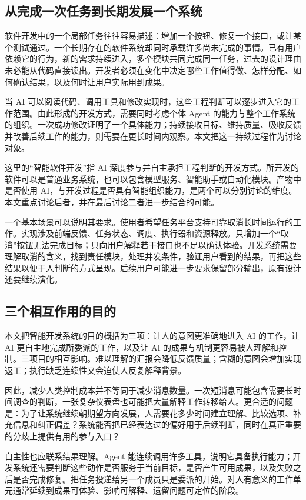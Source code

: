 \label{sec:intro}
\subsection{从完成一次任务到长期发展一个系统}
软件开发中的一个局部任务往往容易描述：增加一个按钮、修复一个接口，或让某个测试通过。一个长期存在的软件系统却同时承载许多尚未完成的事情。已有用户依赖它的行为，新的需求持续进入，多个模块共同完成同一任务，过去的设计理由未必能从代码直接读出。开发者必须在变化中决定哪些工作值得做、怎样分配、如何确认结果，以及何时让用户实际用到成果。

当 AI 可以阅读代码、调用工具和修改实现时，这些工程判断可以逐步进入它的工作范围。由此形成的开发方式，需要同时考虑个体 Agent 的能力与整个工作系统的组织。一次成功修改证明了一个具体能力；持续接收目标、维持质量、吸收反馈并改善后续工作的能力，则需要在更长时间内观察。本文把这一持续过程作为讨论对象。

这里的“智能软件开发”指 AI 深度参与并自主承担工程判断的开发方式。所开发的软件可以是普通业务系统，也可以包含模型服务、智能助手或自动化模块。产物中是否使用 AI，与开发过程是否具有智能组织能力，是两个可以分别讨论的维度。本文重点讨论后者，并在最后讨论二者进一步结合的可能。

一个基本场景可以说明其要求。使用者希望任务平台支持可靠取消长时间运行的工作。实现涉及前端反馈、任务状态、调度、执行器和资源释放。只增加一个“取消”按钮无法完成目标；只向用户解释若干接口也不足以确认体验。开发系统需要理解取消的含义，找到责任模块，处理并发条件，验证用户看到的结果，再把这些结果以便于人判断的方式呈现。后续用户可能进一步要求保留部分输出，原有设计还要继续演化。

\subsection{三个相互作用的目的}
本文把智能开发系统的目的概括为三项：让人的意图更准确地进入 AI 的工作，让 AI 更自主地完成所委派的工作，以及让 AI 的成果与机制更容易被人理解和控制。三项目的相互影响。难以理解的汇报会降低反馈质量；含糊的意图会增加实现返工；执行缺乏连续性又会迫使人反复解释背景。

因此，减少人类控制成本并不等同于减少消息数量。一次短消息可能包含需要长时间调查的判断，一张复杂仪表盘也可能把大量解释工作转移给人。更合适的问题是：为了让系统继续朝期望方向发展，人需要花多少时间建立理解、比较选项、补充信息和纠正偏差？系统能否把已经表达过的偏好用于后续判断，同时在真正重要的分歧上提供有用的参与入口？

自主性也应联系结果理解。Agent 能连续调用许多工具，说明它具备执行能力；开发系统还需要判断这些动作是否服务于当前目标，是否产生可用成果，以及失败之后是否完成修复。把任务投递给另一个成员只是委派的开始。对人有意义的工作单元通常延续到成果可体验、影响可解释、遗留问题可定位的阶段。

